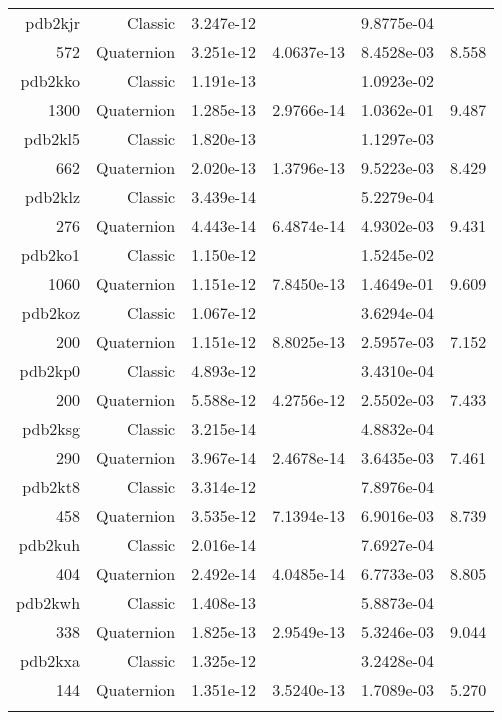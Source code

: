 \begin{xltabular}{\textwidth}{r|rS[table-format=1.3e+2]S[table-format=1.4e+2]S[table-format=1.4e+2]S[table-format=-1.3]}
pdb2kjr & Classic & 3.247e-12 &  & 9.8775e-04 & \\
572 & Quaternion & 3.251e-12 & 4.0637e-13 & 8.4528e-03 & 8.558\\  \addlinespace
pdb2kko & Classic & 1.191e-13 &  & 1.0923e-02 & \\
1300 & Quaternion & 1.285e-13 & 2.9766e-14 & 1.0362e-01 & 9.487\\  \addlinespace
pdb2kl5 & Classic & 1.820e-13 &  & 1.1297e-03 & \\
662 & Quaternion & 2.020e-13 & 1.3796e-13 & 9.5223e-03 & 8.429\\  \addlinespace
pdb2klz & Classic & 3.439e-14 &  & 5.2279e-04 & \\
276 & Quaternion & 4.443e-14 & 6.4874e-14 & 4.9302e-03 & 9.431\\  \addlinespace
pdb2ko1 & Classic & 1.150e-12 &  & 1.5245e-02 & \\
1060 & Quaternion & 1.151e-12 & 7.8450e-13 & 1.4649e-01 & 9.609\\  \addlinespace
pdb2koz & Classic & 1.067e-12 &  & 3.6294e-04 & \\
200 & Quaternion & 1.151e-12 & 8.8025e-13 & 2.5957e-03 & 7.152\\  \addlinespace
pdb2kp0 & Classic & 4.893e-12 &  & 3.4310e-04 & \\
200 & Quaternion & 5.588e-12 & 4.2756e-12 & 2.5502e-03 & 7.433\\  \addlinespace
pdb2ksg & Classic & 3.215e-14 &  & 4.8832e-04 & \\
290 & Quaternion & 3.967e-14 & 2.4678e-14 & 3.6435e-03 & 7.461\\  \addlinespace
pdb2kt8 & Classic & 3.314e-12 &  & 7.8976e-04 & \\
458 & Quaternion & 3.535e-12 & 7.1394e-13 & 6.9016e-03 & 8.739\\  \addlinespace
pdb2kuh & Classic & 2.016e-14 &  & 7.6927e-04 & \\
404 & Quaternion & 2.492e-14 & 4.0485e-14 & 6.7733e-03 & 8.805\\  \addlinespace
pdb2kwh & Classic & 1.408e-13 &  & 5.8873e-04 & \\
338 & Quaternion & 1.825e-13 & 2.9549e-13 & 5.3246e-03 & 9.044\\  \addlinespace
pdb2kxa & Classic & 1.325e-12 &  & 3.2428e-04 & \\
144 & Quaternion & 1.351e-12 & 3.5240e-13 & 1.7089e-03 & 5.270\\  \addlinespace

\end{xltabular}

